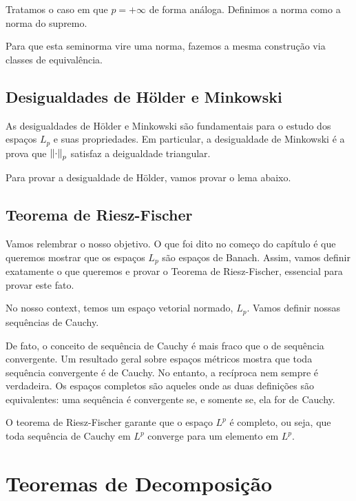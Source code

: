 \LpSpace

Tratamos o caso em que $p=+\infty$ de forma análoga. Definimos a norma como a norma do supremo.

\functionInftySeminorm

Para que esta seminorma vire uma norma, fazemos a mesma construção via classes de equivalência.

\LinftySpace

\subsection{Desigualdades de Hölder e Minkowski}

As desigualdades de Hölder e Minkowski são fundamentais para o estudo dos espaços $L_p$ e suas propriedades. Em particular, a desigualdade de Minkowski é a prova que $\left\lVert \cdot \right\rVert_p$ satisfaz a deigualdade triangular.

Para provar a desigualdade de Hölder, vamos provar o lema abaixo.

\powerInequality

\holder

\minkowski

\subsection{Teorema de Riesz-Fischer}

Vamos relembrar o nosso objetivo. O que foi dito no começo do capítulo é que queremos mostrar que os espaços $L_p$ são espaços de Banach. Assim, vamos definir exatamente o que queremos e provar o Teorema de Riesz-Fischer, essencial para provar este fato.

\banachSpace

No nosso context, temos um espaço vetorial normado, $L_p$. Vamos definir nossas sequências de Cauchy.

\cauchySequenceLp

De fato, o conceito de sequência de Cauchy é mais fraco que o de sequência convergente. Um resultado geral sobre espaços métricos mostra que toda sequência convergente é de Cauchy. No entanto, a recíproca nem sempre é verdadeira. Os espaços completos são aqueles onde as duas definições são equivalentes: uma sequência é convergente se, e somente se, ela for de Cauchy.

O teorema de Riesz-Fischer garante que o espaço $L^p$ é completo, ou seja, que toda sequência de Cauchy em $L^p$ converge para um elemento em $L^p$.

\rieszFischer











\section{Teoremas de Decomposição}